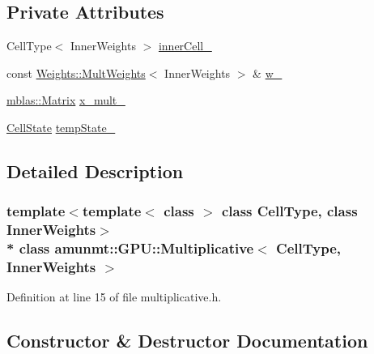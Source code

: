 \subsection*{Private Attributes}
\begin{DoxyCompactItemize}
\item 
Cell\+Type$<$ Inner\+Weights $>$ \hyperlink{classamunmt_1_1GPU_1_1Multiplicative_a365c31555dc63bc9008f39ddd3c3026a}{inner\+Cell\+\_\+}
\item 
const \hyperlink{structamunmt_1_1GPU_1_1Weights_1_1MultWeights}{Weights\+::\+Mult\+Weights}$<$ Inner\+Weights $>$ \& \hyperlink{classamunmt_1_1GPU_1_1Multiplicative_a32dbf949fdc0b61708b5db19e3416b93}{w\+\_\+}
\item 
\hyperlink{namespaceamunmt_1_1GPU_1_1mblas_ab67821a8254de53e45a623cf73c0aef6}{mblas\+::\+Matrix} \hyperlink{classamunmt_1_1GPU_1_1Multiplicative_ac7fc2a007d833891d9be392e4cd79204}{x\+\_\+mult\+\_\+}
\item 
\hyperlink{structamunmt_1_1GPU_1_1CellState}{Cell\+State} \hyperlink{classamunmt_1_1GPU_1_1Multiplicative_ae583681af41e0a7ec9671f14b68b56b8}{temp\+State\+\_\+}
\end{DoxyCompactItemize}


\subsection{Detailed Description}
\subsubsection*{template$<$template$<$ class $>$ class Cell\+Type, class Inner\+Weights$>$\\*
class amunmt\+::\+G\+P\+U\+::\+Multiplicative$<$ Cell\+Type, Inner\+Weights $>$}



Definition at line 15 of file multiplicative.\+h.



\subsection{Constructor \& Destructor Documentation}
